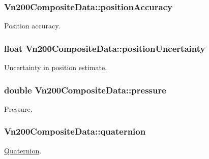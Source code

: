 \subsubsection[{\texorpdfstring{position\+Accuracy}{positionAccuracy}}]{ Vn200\+Composite\+Data\+::position\+Accuracy}\hypertarget{structVn200CompositeData_a72dc6d7bad9d88af97e5dbf769e3afe7}{}\label{structVn200CompositeData_a72dc6d7bad9d88af97e5dbf769e3afe7}
Position accuracy. 
\subsubsection[{\texorpdfstring{position\+Uncertainty}{positionUncertainty}}]{\setlength{\rightskip}{0pt plus 5cm}float Vn200\+Composite\+Data\+::position\+Uncertainty}\hypertarget{structVn200CompositeData_ab2c4279bb170d94ab42820b6abf36493}{}\label{structVn200CompositeData_ab2c4279bb170d94ab42820b6abf36493}
Uncertainty in position estimate. 
\subsubsection[{\texorpdfstring{pressure}{pressure}}]{\setlength{\rightskip}{0pt plus 5cm}double Vn200\+Composite\+Data\+::pressure}\hypertarget{structVn200CompositeData_a91264496d6da4aeb32135a1f0e5e03dc}{}\label{structVn200CompositeData_a91264496d6da4aeb32135a1f0e5e03dc}
Pressure. 
\subsubsection[{\texorpdfstring{quaternion}{quaternion}}]{ Vn200\+Composite\+Data\+::quaternion}\hypertarget{structVn200CompositeData_ae8f8f1bb7562a36c339d0277c9482b9c}{}\label{structVn200CompositeData_ae8f8f1bb7562a36c339d0277c9482b9c}
\hyperlink{classQuaternion}{Quaternion}. 
